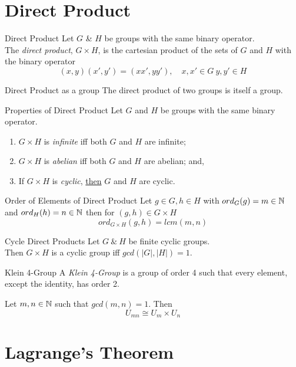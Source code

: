 \documentclass[11pt,a4paper]{article}
\begin{document}
\section{Direct Product}

\subtitle{Definition 10.01 - }{Direct Product}
Let $G$ \& $H$ be groups with the same binary operator.\\
The \textit{direct product}, $G \times H$, is the cartesian product of the sets of $G$ and $H$ with the binary operator
$$(x, y)(x', y') = (xx', yy'),\quad x, x' \in G\ y, y' \in H$$

\subtitle{Proposition 10.02 - }{Direct Product as a group}
The direct product of two groups is itself a group.\\

\subtitle{Proposition 10.03 - }{Properties of Direct Product}
Let $G$ and $H$ be groups with the same binary operator.
\begin{enumerate}[label=\roman*)]
  \item $G \times H$ is \textit{infinite} iff both $G$ and $H$ are infinite;
  \item $G \times H$ is \textit{abelian} iff both $G$ and $H$ are abelian; and,
  \item If $G \times H$ is \textit{cyclic}, \underline{then} $G$ and $H$ are cyclic.\\
\end{enumerate}

\subtitle{Proposition 10.04 - }{Order of Elements of Direct Product}
Let $g \in G, h \in H$ with $ord_G(g) = m \in \mathbb{N}$ and $ord_H(h) = n \in \mathbb{N}$ then for $(g, h) \in G \times H$
$$ord_{G \times H}(g, h) = lcm(m, n)$$

\subtitle{Theorem 10.05 - }{Cycle Direct Products}
Let $G\ \&\ H$ be finite cyclic groups.\\
Then $G \times H$ is a cyclic group iff $gcd(|G|, |H|) = 1$.\\

\subtitle{Definition 10.06 - }{Klein 4-Group}
A \textit{Klein 4-Group} is a group of order 4 such that every element, except the identity, has order 2.\\

\subtitle{Proposition 10.07 - }{}
Let $m, n \in \mathbb{N}$ such that $gcd(m,n) = 1$. Then
$$U_{mn} \cong U_m \times U_n$$

\section{Lagrange's Theorem}
\end{document}
